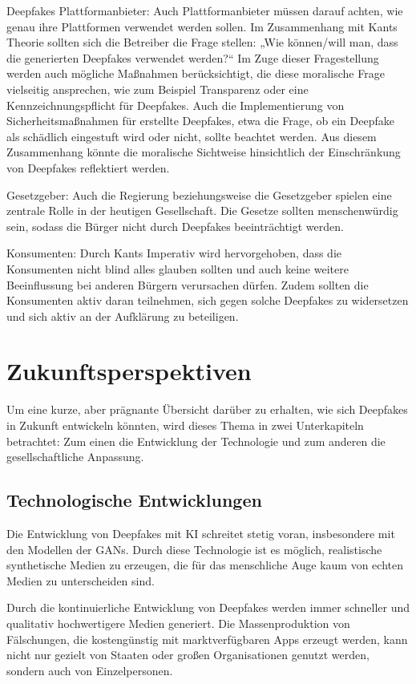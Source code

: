 \documentclass[a4paper,12pt]{article}
\begin{document}
Deepfakes Plattformanbieter:
Auch Plattformanbieter müssen darauf achten, wie genau ihre Plattformen verwendet werden sollen. 
Im Zusammenhang mit Kants Theorie sollten sich die Betreiber die Frage stellen: „Wie können/will man, dass die generierten Deepfakes verwendet werden?“
Im Zuge dieser Fragestellung werden auch mögliche Maßnahmen berücksichtigt, die diese moralische Frage vielseitig ansprechen, 
wie zum Beispiel Transparenz oder eine Kennzeichnungspflicht für Deepfakes. Auch die Implementierung von Sicherheitsmaßnahmen für erstellte Deepfakes, etwa die Frage, 
ob ein Deepfake als schädlich eingestuft wird oder nicht, sollte beachtet werden. 
Aus diesem Zusammenhang könnte die moralische Sichtweise hinsichtlich der Einschränkung von Deepfakes reflektiert werden. \cite{Brennan2024} \cite{KantMetaphysik}

Gesetzgeber:
Auch die Regierung beziehungsweise die Gesetzgeber spielen eine zentrale Rolle in der heutigen Gesellschaft. 
Die Gesetze sollten menschenwürdig sein, sodass die Bürger nicht durch Deepfakes beeinträchtigt werden. \cite{ThomsonReuters2024} \cite{KantMetaphysik}

Konsumenten:
Durch Kants Imperativ wird hervorgehoben, dass die Konsumenten nicht blind alles glauben sollten und auch keine weitere Beeinflussung bei anderen Bürgern verursachen dürfen. 
Zudem sollten die Konsumenten aktiv daran teilnehmen, sich gegen solche Deepfakes zu widersetzen und sich aktiv an der Aufklärung zu beteiligen. \cite{UNR2023} \cite{KantMetaphysik}
\newpage

\section{Zukunftsperspektiven}
Um eine kurze, aber prägnante Übersicht darüber zu erhalten, wie sich Deepfakes in Zukunft entwickeln könnten, 
wird dieses Thema in zwei Unterkapiteln betrachtet: Zum einen die Entwicklung der Technologie und zum anderen die gesellschaftliche Anpassung.
\subsection{Technologische Entwicklungen}
Die Entwicklung von Deepfakes mit KI schreitet stetig voran, insbesondere mit den Modellen der GANs. 
Durch diese Technologie ist es möglich, realistische synthetische Medien zu erzeugen, die für das menschliche Auge kaum von echten Medien zu unterscheiden sind.  

Durch die kontinuierliche Entwicklung von Deepfakes werden immer schneller und qualitativ hochwertigere Medien generiert. 
Die Massenproduktion von Fälschungen, die kostengünstig mit marktverfügbaren Apps erzeugt werden, kann nicht nur gezielt von Staaten oder großen Organisationen genutzt werden, 
sondern auch von Einzelpersonen. \cite{SWP2024}
\end{document}
